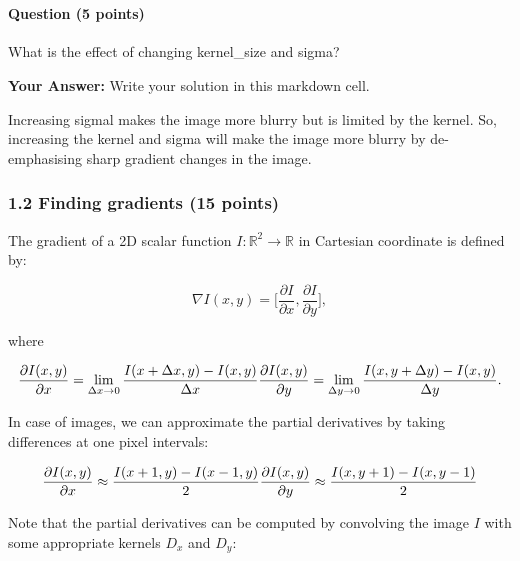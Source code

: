 \documentclass[11pt]{article}
\begin{document}
    \begin{center}
    \end{center}
    { \hspace*{\fill} \\}
    
    \hypertarget{question-5-points}{%
\paragraph{Question (5 points)}\label{question-5-points}}

What is the effect of changing kernel\_size and sigma?

    \textbf{Your Answer:} Write your solution in this markdown cell.

Increasing sigmal makes the image more blurry but is limited by the
kernel. So, increasing the kernel and sigma will make the image more
blurry by de-emphasising sharp gradient changes in the image.

    \hypertarget{finding-gradients-15-points}{%
\subsubsection{1.2 Finding gradients (15
points)}\label{finding-gradients-15-points}}

The gradient of a 2D scalar function
\(I:\mathbb{R}^2\rightarrow{\mathbb{R}}\) in Cartesian coordinate is
defined by:

\[\nabla{I(x,y)}=\bigl[\frac{\partial{I}}{\partial{x}},\frac{\partial{I}}{\partial{y}}\bigr],\]

where

\[
\frac{\partial{I(x,y)}}{\partial{x}}=\lim_{\Delta{x}\to{0}}\frac{I(x+\Delta{x},y)-I(x,y)}{\Delta{x}} \\
\frac{\partial{I(x,y)}}{\partial{y}}=\lim_{\Delta{y}\to{0}}\frac{I(x,y+\Delta{y})-I(x,y)}{\Delta{y}}.
\]

In case of images, we can approximate the partial derivatives by taking
differences at one pixel intervals:

\[
\frac{\partial{I(x,y)}}{\partial{x}}\approx{\frac{I(x+1,y)-I(x-1,y)}{2}} \\
\frac{\partial{I(x,y)}}{\partial{y}}\approx{\frac{I(x,y+1)-I(x,y-1)}{2}}
\]

Note that the partial derivatives can be computed by convolving the
image \(I\) with some appropriate kernels \(D_x\) and \(D_y\):
\end{document}
